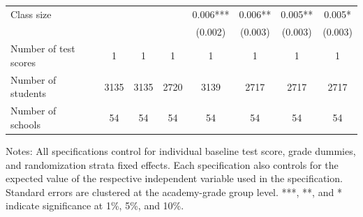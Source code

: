 \begin{table}[H]
\begin{scriptsize}
\begin{threeparttable}
\begin{tabular} {@{} l l c c c c c c c  @{}}
Class size &  &  &  &  & 0.006*** & 0.006** & 0.005** & 0.005* \\
                 &  &  &  &  & (0.002) & (0.003) & (0.003) & (0.003) \\
\midrule
Number of test scores &  & 1 & 1 & 1 & 1 & 1 & 1 & 1 \\
Number of students &  & 3135 & 3135 & 2720 & 3139 & 2717 & 2717 & 2717 \\
Number of schools &  & 54 & 54 & 54 & 54 & 54 & 54 & 54 \\
\bottomrule
\end{tabular}
\begin{tablenotes}
\item Notes: All specifications control for individual baseline test score, grade dummies, and randomization strata fixed effects. Each specification also controls for the expected value of the respective independent variable used in the specification. Standard errors are clustered at the academy-grade group level. ***, **, and * indicate significance at 1\%, 5\%, and 10\%.
\end{tablenotes}
\end{threeparttable}
\end{scriptsize}
\end{table}
